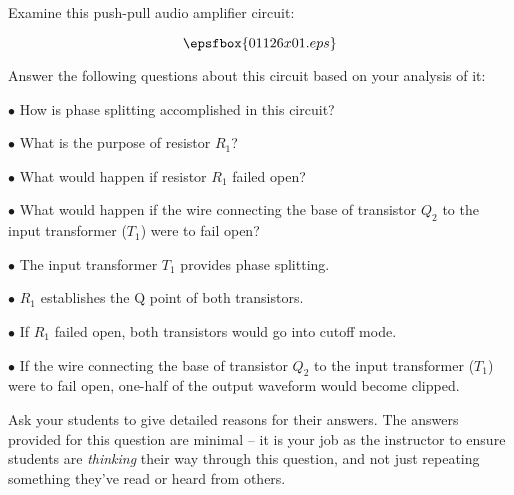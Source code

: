 

Examine this push-pull audio amplifier circuit:

$$\epsfbox{01126x01.eps}$$

Answer the following questions about this circuit based on your analysis of it:

\medskip
\item{$\bullet$} How is phase splitting accomplished in this circuit? 
\item{$\bullet$} What is the purpose of resistor $R_1$? 
\item{$\bullet$} What would happen if resistor $R_1$ failed open?
\item{$\bullet$} What would happen if the wire connecting the base of transistor $Q_2$ to the input transformer ($T_1$) were to fail open?
\medskip







\medskip
\item{$\bullet$} The input transformer $T_1$ provides phase splitting. 
\item{$\bullet$} $R_1$ establishes the Q point of both transistors.
\item{$\bullet$} If $R_1$ failed open, both transistors would go into cutoff mode.
\item{$\bullet$} If the wire connecting the base of transistor $Q_2$ to the input transformer ($T_1$) were to fail open, one-half of the output waveform would become clipped. 
\medskip









Ask your students to give detailed reasons for their answers.  The answers provided for this question are minimal -- it is your job as the instructor to ensure students are {\it thinking} their way through this question, and not just repeating something they've read or heard from others.




